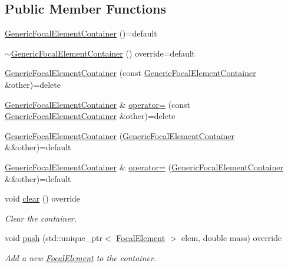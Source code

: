 \subsection*{Public Member Functions}
\begin{DoxyCompactItemize}
\item 
\hyperlink{classGenericFocalElementContainer_aa8e8154ce9932e6214d865ffc4fa7b60}{Generic\+Focal\+Element\+Container} ()=default
\item 
\hyperlink{classGenericFocalElementContainer_ac93b03b7224ba2163c68201e671e5a1b}{$\sim$\+Generic\+Focal\+Element\+Container} () override=default
\item 
\hyperlink{classGenericFocalElementContainer_ae06b7cfd2004b2c85fe5e92d0d0c0849}{Generic\+Focal\+Element\+Container} (const \hyperlink{classGenericFocalElementContainer}{Generic\+Focal\+Element\+Container} \&other)=delete
\item 
\hyperlink{classGenericFocalElementContainer}{Generic\+Focal\+Element\+Container} \& \hyperlink{classGenericFocalElementContainer_a454c37aa1696dfdbfb9f774edb2c727a}{operator=} (const \hyperlink{classGenericFocalElementContainer}{Generic\+Focal\+Element\+Container} \&other)=delete
\item 
\hyperlink{classGenericFocalElementContainer_a66bf2df46b7897834b4c67b3b8283342}{Generic\+Focal\+Element\+Container} (\hyperlink{classGenericFocalElementContainer}{Generic\+Focal\+Element\+Container} \&\&other)=default
\item 
\hyperlink{classGenericFocalElementContainer}{Generic\+Focal\+Element\+Container} \& \hyperlink{classGenericFocalElementContainer_a206a3e5a1ab891899997e7a9f07987ba}{operator=} (\hyperlink{classGenericFocalElementContainer}{Generic\+Focal\+Element\+Container} \&\&other)=default
\item 
void \hyperlink{classGenericFocalElementContainer_aa20631dceaa742116e6ad6ddf7a38555}{clear} () override
\begin{DoxyCompactList}\small\item\em Clear the container. \end{DoxyCompactList}\item 
void \hyperlink{classGenericFocalElementContainer_aefcc139561645f96f3ec877992005d2b}{push} (std\+::unique\+\_\+ptr$<$ \hyperlink{classFocalElement}{Focal\+Element} $>$ elem, double mass) override
\begin{DoxyCompactList}\small\item\em Add a new \hyperlink{classFocalElement}{Focal\+Element} to the container. \end{DoxyCompactList}\item 

\end{DoxyCompactItemize}
